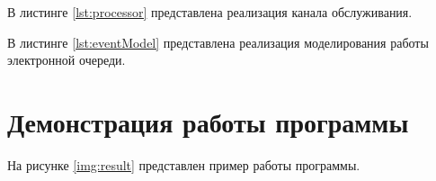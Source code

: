 \documentclass{bmstu}
\begin{document}
В листинге \ref{lst:processor} представлена реализация канала обслуживания.


В листинге \ref{lst:eventModel} представлена реализация моделирования работы электронной очереди.


\clearpage

\section{Демонстрация работы программы}

На рисунке \ref{img:result} представлен пример работы программы.

\end{document}
